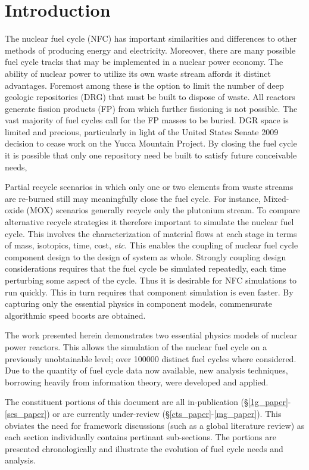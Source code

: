 \chapter{Introduction}
\label{diss_intro}
The nuclear fuel cycle (NFC) has important similarities and differences to other
methods of producing energy and electricity. 
Moreover, there are many possible fuel cycle tracks that may be implemented in a nuclear power economy.
The ability of nuclear power to utilize its own waste stream affords it distinct advantages.  
Foremost among these is the option to limit the number of deep geologic repositories (DRG) 
that must be built to dispose of waste.   All reactors generate fission products (FP) from 
which further fissioning is not possible.  The vast majority of fuel cycles call for the FP masses 
to be buried.  DGR space is limited and precious, particularly in light of the United States Senate 2009
decision to cease work on the Yucca Mountain Project.  
By closing the fuel cycle it is possible  that only one repository need be built to satisfy 
future conceivable needs, 

Partial recycle scenarios in which only one or two 
elements from waste streams are re-burned still may meaningfully close the fuel cycle.  
For instance, Mixed-oxide (MOX) scenarios generally recycle only the plutonium stream.  
To compare alternative recycle strategies it therefore important to simulate the nuclear fuel cycle.  
This involves the characterization 
of material flows at each stage in terms of mass, isotopics, time, cost, \emph{etc}.  This enables 
the coupling of nuclear fuel cycle component design to the design of system as whole.  
Strongly coupling design considerations requires that the fuel cycle be simulated repeatedly, each 
time perturbing some aspect of the cycle.  Thus it is desirable for
NFC simulations to run quickly.  This in turn requires that component simulation is even faster. 
By capturing only the essential physics in component models, commensurate algorithmic speed 
boosts are obtained.

The work presented herein demonstrates two essential physics models of nuclear power reactors.
This allows the simulation of the nuclear fuel cycle on a previously unobtainable level; over 
100000 distinct fuel cycles where considered.  Due to the quantity of fuel cycle data now 
available, new analysis techniques, borrowing heavily from information theory, were developed 
and applied.

The constituent portions of this document are all in-publication (\S \ref{1g_paper}-\ref{ses_paper})
or are currently under-review (\S \ref{cts_paper}-\ref{mg_paper}).  This obviates the need
for framework discussions (such as a global literature review) as each section individually
contains pertinant sub-sections.  The portions are presented chronologically and illustrate the 
evolution of fuel cycle needs and analysis.

